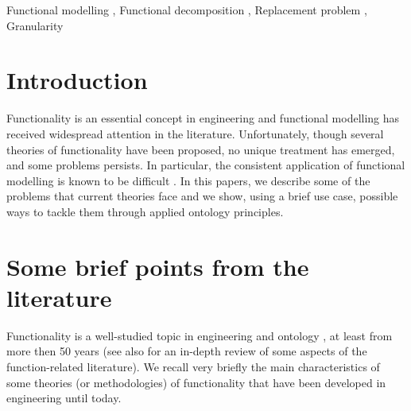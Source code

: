\documentclass[
]{ceurart}
\begin{document}
\begin{keywords}
  Functional modelling \sep
  Functional decomposition \sep
  Replacement problem \sep
  Granularity
\end{keywords}

\maketitle


\section{Introduction}
    
Functionality is an essential concept in engineering and functional modelling has received widespread attention in the literature. 
Unfortunately, though several theories of functionality have been proposed, no unique treatment has emerged, and some problems persists. In particular, the consistent application of functional modelling is known to be difficult \cite{eckertThatWhichNot2013}.
In this papers, we describe some of the problems that current theories face and we show, using a brief use case, possible ways to tackle them through applied ontology principles. 

\section{Some brief points from the literature}\label{sec:literature}

Functionality is a well-studied topic in engineering \cite{chandrasekaranFunctionalRepresentationDesign1993, umedaFunctionBehaviourStructure1990, hirtz_functional_2002} and ontology \cite{sasajimaFBRLFunctionBehavior1995, TowardAUnifiedDefinition2012}, at least from more then 50 years \cite{collinsFailureExperienceMatrixUseful1976,pahl_engineering_2007} (see also \cite{erdenReviewFunctionModeling2008} for an in-depth review of some aspects of the function-related literature).
We recall very briefly the main characteristics of some theories (or methodologies) of functionality that have been developed in engineering until today.
\end{document}
